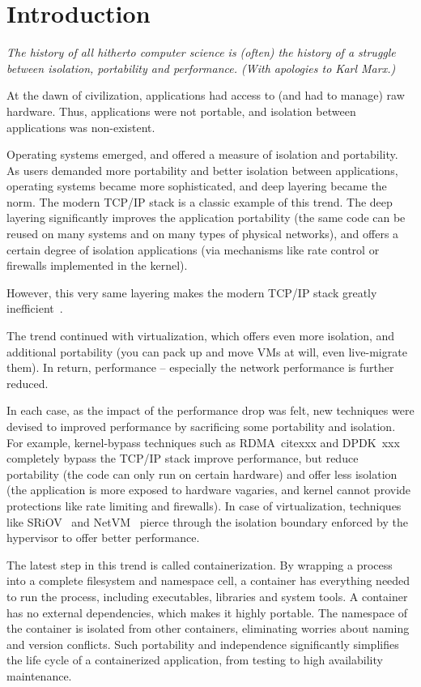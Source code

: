\section{Introduction} 
\label{sec:introduction}

{\em 
The history of all hitherto computer science is (often) the history of a
struggle between isolation, portability and performance. (With apologies to Karl
Marx.)}

At the dawn of civilization, applications had access to (and had to manage) raw
hardware. Thus, applications were not portable, and isolation between
applications was non-existent.

Operating systems emerged, and offered a measure of isolation and portability.
As users demanded more portability and better isolation between applications,
operating systems became more sophisticated, and deep layering became the norm.
The modern TCP/IP stack is a classic example of this trend. The deep layering
significantly improves the application portability (the same code can be reused
on many systems and on many types of physical networks), and offers a certain
degree of isolation applications (via mechanisms like rate control or firewalls
implemented in the kernel). 

However, this very same layering makes the modern TCP/IP stack greatly
inefficient~\cite{dcqcn,luigipapers}. 

The trend continued with virtualization, which offers even more isolation, and
additional portability (you can pack up and move VMs at will, even live-migrate
them). In return, performance -- especially the network performance is further
reduced.

In each case, as the impact of the performance drop was felt, new techniques
were devised to improved performance by sacrificing some portability and
isolation.  For example, kernel-bypass techniques such as RDMA~cite{xxx} and
DPDK~{xxx} completely bypass the TCP/IP stack improve performance, but reduce
portability (the code can only run on certain hardware) and offer less isolation
(the application is more exposed to hardware vagaries, and kernel cannot provide
protections like rate limiting and firewalls). In case of virtualization,
techniques like SRiOV~\cite{xxx} and NetVM~\cite{xxx} pierce through the
isolation boundary enforced by the hypervisor to offer better performance. 

The latest step in this trend is called containerization.  By wrapping a process
into a complete filesystem and namespace cell, a container has everything needed
to run the process, including executables, libraries and system tools.  A
container has no external dependencies, which makes it highly portable. The
namespace of the container is isolated from other containers, eliminating
worries about naming and version conflicts.  Such portability and independence
significantly simplifies the life cycle of a containerized application, from
testing to high availability maintenance.

